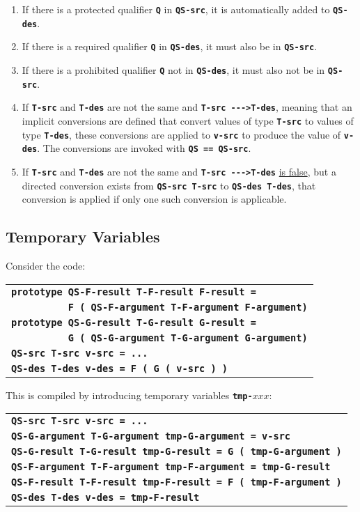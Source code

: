 \documentclass[12pt]{article}
\newcommand{\TT}[1]{{\tt \bfseries #1}}
\begin{document}
\begin{enumerate}
\item If there is a protected qualifier \TT{Q} in \TT{QS-src}, it
is automatically added to \TT{QS-des}.
\item If there is a required qualifier \TT{Q} in \TT{QS-des}, it
must also be in \TT{QS-src}.
\item If there is a prohibited qualifier \TT{Q} not in \TT{QS-des}, it
must also not be in \TT{QS-src}.
\item If \TT{T-src} and \TT{T-des} are not the same
and \TT{T-src~-{}-{}->T-des},
meaning that an implicit conversions are defined that convert values
of type \TT{T-src} to values of type \TT{T-des}, these conversions are
applied to \TT{v-src} to produce the value of \TT{v-des}.
The conversions are invoked with \TT{QS == QS-src}.
\item
\label{DIRECT-CONVERSION-ASSIGMENTS}
If \TT{T-src} and \TT{T-des} are not the same and \TT{T-src~-{}-{}->T-des}
\underline{is false}, but a directed conversion exists from
\TT{QS-src T-src} to \TT{QS-des T-des}, that conversion is applied
if only one such conversion is applicable.
\end{enumerate}


\subsection{Temporary Variables}
\label{TEMPORARY-VARIABLES}

Consider the code:

\begin{center}
\begin{tabular}{l}
\TT{prototype QS-F-result T-F-result F-result =} \\
\TT{~~~~~~~~~~F ( QS-F-argument T-F-argument F-argument)} \\
\TT{prototype QS-G-result T-G-result G-result =} \\
\TT{~~~~~~~~~~G ( QS-G-argument T-G-argument G-argument)} \\
\TT{QS-src T-src v-src = ...} \\
\TT{QS-des T-des v-des = F ( G ( v-src ) )} \\
\end{tabular}
\end{center}

This is compiled by introducing temporary variables \TT{tmp-}$xxx$:

\begin{center}
\begin{tabular}{l}
\TT{QS-src T-src v-src = ...} \\
\TT{QS-G-argument T-G-argument tmp-G-argument = v-src} \\
\TT{QS-G-result T-G-result tmp-G-result = G ( tmp-G-argument )} \\
\TT{QS-F-argument T-F-argument tmp-F-argument = tmp-G-result} \\
\TT{QS-F-result T-F-result tmp-F-result = F ( tmp-F-argument )} \\
\TT{QS-des T-des v-des = tmp-F-result} \\
\end{tabular}
\end{center}
\end{document}
